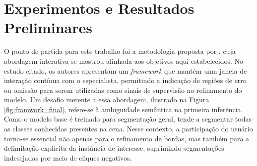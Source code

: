 \section{Experimentos e Resultados Preliminares}
\label{base_experimental}

O ponto de partida para este trabalho foi a metodologia proposta por , cuja abordagem interativa se mostrou alinhada aos objetivos aqui estabelecidos. No estudo citado, os autores apresentam um \textit{framework} que mantém uma janela de interação contínua com o especialista, permitindo a indicação de regiões de erro ou omissão para serem utilizadas como sinais de supervisão no refinamento do modelo. Um desafio inerente a essa abordagem, ilustrado na Figura \ref{fig:framwork_final}, refere-se à ambiguidade semântica na primeira inferência. Como o modelo base é treinado para segmentação geral, tende a segmentar todas as classes conhecidas presentes na cena. Nesse contexto, a participação do usuário torna-se essencial não apenas para o refinamento de bordas, mas também para a delimitação explícita da instância de interesse, suprimindo segmentações indesejadas por meio de cliques negativos.


